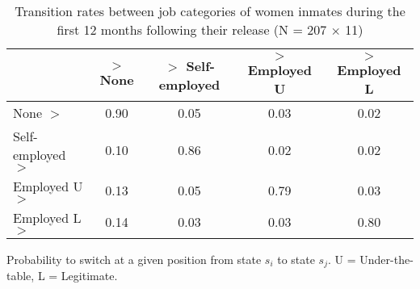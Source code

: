 \begin{table}[htp]
\footnotesize
\setlength{\tabcolsep}{10pt}
\renewcommand{\arraystretch}{1.3}
\begin{threeparttable}
\centering
\caption{Transition rates between job categories of women inmates \newline
    during the first 12 months following their release (N = 207 $\times$ 11)} 
\label{tab:transition_rates_jobs}
\begin{tabular}{lcccc}
  \hline
 & $>$ None & $>$ Self-employed & $>$ Employed U & $>$ Employed L \\ 
  \hline
None $>$ & 0.90 & 0.05 & 0.03 & 0.02 \\ 
  Self-employed $>$ & 0.10 & 0.86 & 0.02 & 0.02 \\ 
  Employed U $>$ & 0.13 & 0.05 & 0.79 & 0.03 \\ 
  Employed L $>$ & 0.14 & 0.03 & 0.03 & 0.80 \\ 
   \hline
\end{tabular}
\begin{tablenotes}
\scriptsize
\item Probability to switch at a given position from state $s_i$ to state $s_j$. U = Under-the-table, L = Legitimate.
\end{tablenotes}
\end{threeparttable}
\end{table}
